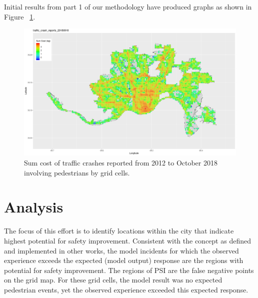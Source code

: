 \documentclass{llncs}
\begin{document}
Initial results from part 1 of our methodology have produced graphs as shown in Figure ~\ref{figure:SumCrashPlot}. \newline
\FloatBarrier
\begin{figure}
 	\includegraphics[width=\textwidth, height=\textheight, keepaspectratio]{TrafficCrashReports20180918SumCostMapped2Grid.png}
 	\caption{Sum cost of traffic crashes reported from 2012 to October 2018 involving pedestrians by grid cells.}
	\label{figure:SumCrashPlot}
\end{figure}
\FloatBarrier
%
\section{Analysis}
%
The focus of this effort is to identify locations within the city that indicate highest potential for safety improvement. Consistent with the concept as defined and implemented in other works, the model incidents for which the observed experience exceeds the expected (model output) response are the regions with potential for safety improvement. The regions of PSI are the false negative points on the grid map. For these grid cells, the model result was no expected pedestrian events, yet the observed experience exceeded this expected response.

%
\end{document}
